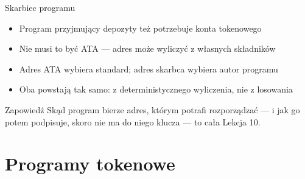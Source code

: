 \begin{frame}{Skarbiec programu}
  \begin{itemize}
    \item Program przyjmujący depozyty też potrzebuje konta tokenowego
    \item Nie musi to być ATA --- adres może wyliczyć z własnych składników
    \item Adres ATA wybiera standard; adres skarbca wybiera autor programu
    \item Oba powstają tak samo: z deterministycznego wyliczenia, nie z losowania
  \end{itemize}
  \vspace{0.25cm}
  \begin{exampleblock}{Zapowiedź}
    Skąd program bierze adres, którym potrafi rozporządzać --- i jak go potem
    podpisuje, skoro nie ma do niego klucza --- to cała Lekcja 10.
  \end{exampleblock}
\end{frame}

\section{Programy tokenowe}

